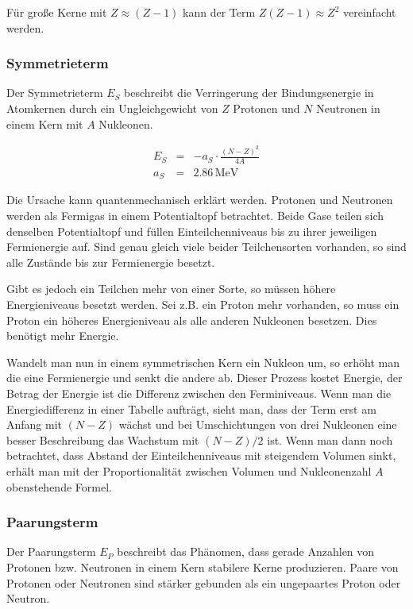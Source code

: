 \documentclass[12pt,a4paper]{scrartcl}
\numberwithin{equation}{section} %
\renewcommand{\[}{} %
\renewcommand{\]}{\noindent} %
\begin{document}
Für große Kerne mit \(Z\approx(Z-1)\) kann der Term
\(Z(Z-1)\approx Z^2\) vereinfacht werden.

\hypertarget{symmetrieterm}{%
\subsubsection{Symmetrieterm}\label{symmetrieterm}}

Der Symmetrieterm \(E_S\) beschreibt die Verringerung der
Bindungsenergie in Atomkernen durch ein Ungleichgewicht von \(Z\)
Protonen und \(N\) Neutronen in einem Kern mit \(A\) Nukleonen.

\[
\begin{eqnarray}
        E_S &=& - a_S\cdot \frac{(N-Z)^2}{4A} \\
        a_S &=& 2.86\mathrm{\,MeV}
\end{eqnarray}
\]

Die Ursache kann quantenmechanisch erklärt werden. Protonen und
Neutronen werden als Fermigas in einem Potentialtopf betrachtet. Beide
Gase teilen sich denselben Potentialtopf und füllen Einteilchenniveaus
bis zu ihrer jeweiligen Fermienergie auf. Sind genau gleich viele beider
Teilchensorten vorhanden, so sind alle Zustände bis zur Fermienergie
besetzt.

Gibt es jedoch ein Teilchen mehr von einer Sorte, so müssen höhere
Energieniveaus besetzt werden. Sei z.B. ein Proton mehr vorhanden, so
muss ein Proton ein höheres Energieniveau als alle anderen Nukleonen
besetzen. Dies benötigt mehr Energie.

Wandelt man nun in einem symmetrischen Kern ein Nukleon um, so erhöht
man die eine Fermienergie und senkt die andere ab. Dieser Prozess kostet
Energie, der Betrag der Energie ist die Differenz zwischen den
Ferminiveaus. Wenn man die Energiedifferenz in einer Tabelle aufträgt,
sieht man, dass der Term erst am Anfang mit \((N-Z)\) wächst und bei
Umschichtungen von drei Nukleonen eine besser Beschreibung das Wachstum
mit \((N-Z)/2\) ist. Wenn man dann noch betrachtet, dass Abstand der
Einteilchenniveaus mit steigendem Volumen sinkt, erhält man mit der
Proportionalität zwischen Volumen und Nukleonenzahl \(A\) obenstehende
Formel.

\hypertarget{paarungsterm}{%
\subsubsection{Paarungsterm}\label{paarungsterm}}

Der Paarungsterm \(E_P\) beschreibt das Phänomen, dass gerade Anzahlen
von Protonen bzw. Neutronen in einem Kern stabilere Kerne produzieren.
Paare von Protonen oder Neutronen sind stärker gebunden als ein
ungepaartes Proton oder Neutron.
\end{document}
